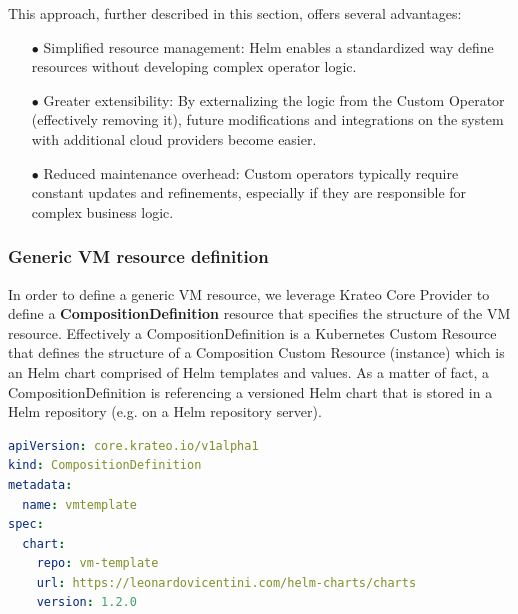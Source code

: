 This approach, further described in this section, offers several advantages:
\begin{itemize}[itemsep=0.2pt, topsep=1pt]
  \item[$\bullet$] Simplified resource management: Helm enables a standardized way define resources without developing complex operator logic.
  \item[$\bullet$] Greater extensibility: By externalizing the logic from the Custom Operator (effectively removing it), future modifications and integrations on the system with additional cloud providers become easier.
  \item[$\bullet$] Reduced maintenance overhead: Custom operators typically require constant updates and refinements, especially if they are responsible for complex business logic. 
\end{itemize}

\subsubsection{Generic VM resource definition}


In order to define a generic VM resource, we leverage Krateo Core Provider to define a \textbf{CompositionDefinition} resource that specifies the structure of the VM resource.
Effectively a CompositionDefinition is a Kubernetes Custom Resource that defines the structure of a Composition Custom Resource (instance) which is an Helm chart comprised of Helm templates and values.
As a matter of fact, a CompositionDefinition is referencing a versioned Helm chart that is stored in a Helm repository (e.g. on a Helm repository server).

\begin{lstlisting}[language=yaml, caption={CompositionDefinition}, label={lst:composition_definition}]
apiVersion: core.krateo.io/v1alpha1
kind: CompositionDefinition
metadata:
  name: vmtemplate
spec:
  chart:
    repo: vm-template
    url: https://leonardovicentini.com/helm-charts/charts
    version: 1.2.0
\end{lstlisting}

